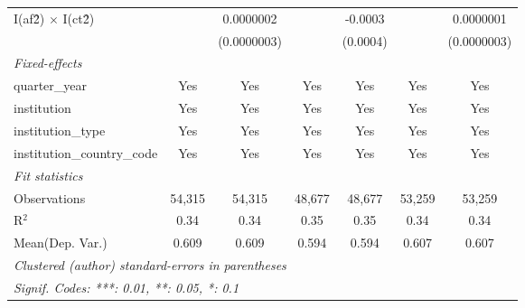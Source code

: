 \begin{tabular}{lcccccc}
   I(af\^2) $\times$ I(ct\^2)         &               & 0.0000002     &               & -0.0003        &               & 0.0000001\\   
                                      &               & (0.0000003)   &               & (0.0004)       &               & (0.0000003)\\   
   \midrule
   \emph{Fixed-effects}\\
   quarter\_year                      & Yes           & Yes           & Yes           & Yes            & Yes           & Yes\\  
   institution                        & Yes           & Yes           & Yes           & Yes            & Yes           & Yes\\  
   institution\_type                  & Yes           & Yes           & Yes           & Yes            & Yes           & Yes\\  
   institution\_country\_code         & Yes           & Yes           & Yes           & Yes            & Yes           & Yes\\  
   \midrule
   \emph{Fit statistics}\\
   Observations                       & 54,315        & 54,315        & 48,677        & 48,677         & 53,259        & 53,259\\  
   R$^2$                              & 0.34          & 0.34          & 0.35          & 0.35           & 0.34          & 0.34\\  
Mean(Dep. Var.) & 0.609 & 0.609 & 0.594 & 0.594 & 0.607 & 0.607 \\
   \midrule \midrule
   \multicolumn{7}{l}{\emph{Clustered (author) standard-errors in parentheses}}\\
   \multicolumn{7}{l}{\emph{Signif. Codes: ***: 0.01, **: 0.05, *: 0.1}}\\
\end{tabular}
\par\endgroup
